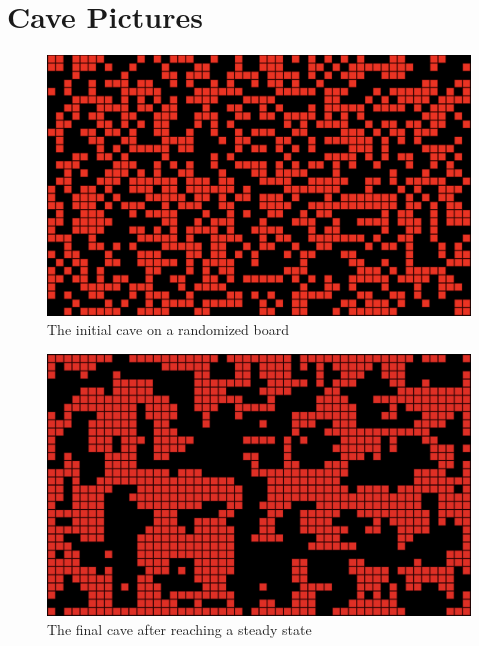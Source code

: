\documentclass[a4paper, 12pt]{article}
\begin{document}
\section{Cave Pictures}
\label{sec:cavePictures}

\begin{figure}[h]
	\centering
	\includegraphics[width=\textwidth]{initial-cave.png}
	\caption{The initial cave on a randomized board}
	\label{fig:initialCave}
\end{figure}

\begin{figure}[h]
	\centering
	\includegraphics[width=\textwidth]{one-step-cave.png}
	\caption{The final cave after reaching a steady state}
	\label{fig:oneStepCave}
\end{figure}
\end{document}
